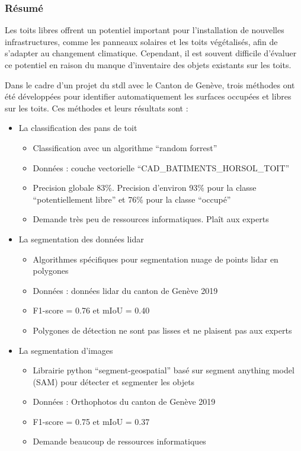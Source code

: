 \subsubsection{Résumé}
\par{Les toits libres offrent un potentiel important pour l'installation de nouvelles infrastructures, comme les panneaux solaires et les toits végétalisés, afin de s'adapter au changement climatique. Cependant, il est souvent difficile d'évaluer ce potentiel en raison du manque d'inventaire des objets existants sur les toits.}

\par{Dans le cadre d'un projet \cite{herny_detection_2024} du \acrshort{stdl} avec le Canton de Genève, trois méthodes ont été développées pour identifier automatiquement les surfaces occupées et libres sur les toits. Ces méthodes et leurs résultats sont :}
\begin{itemize}
    \item La classification des pans de toit
    \begin{itemize}
        \item Classification avec un algorithme ``random forrest''
        \item Données : couche vectorielle ``CAD\_BATIMENTS\_HORSOL\_TOIT'' \cite{sitg_toits_nodate}
        \item Precision globale 83\%. Precision d'environ 93\% pour la classe ``potentiellement libre'' et 76\% pour la classe ``occupé''
        \item Demande très peu de ressources informatiques. Plaît aux experts
    \end{itemize}
    \item La segmentation des données \gls{lidar}
    \begin{itemize}
        \item Algorithmes spécifiques pour segmentation nuage de points \gls{lidar} en polygones
        \item Données : données \gls{lidar} du canton de Genève 2019 \cite{sitg_nuages_2019}
        \item F1-score = 0.76 et mIoU = 0.40
        \item Polygones de détection ne sont pas lisses et ne plaisent pas aux experts
    \end{itemize}
    \item La segmentation d'images
    \begin{itemize}
        \item Librairie python ``segment-geospatial'' \cite{wu_samgeo_2023} basé sur segment anything model (SAM) pour détecter et segmenter les objets
        \item Données : Orthophotos du canton de Genève 2019 \cite{sitg_orthophotos_nodate}
        \item F1-score = 0.75 et mIoU = 0.37
        \item Demande beaucoup de ressources informatiques
    \end{itemize}
\end{itemize}

